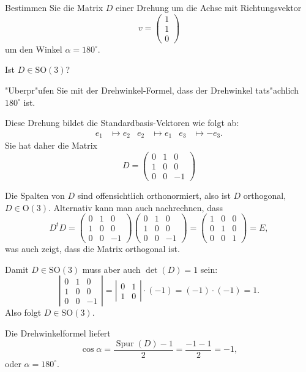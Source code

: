 Bestimmen Sie die Matrix $D$ einer Drehung um die Achse mit Richtungsvektor
\[
v=\begin{pmatrix}1\\1\\0\end{pmatrix}
\]
um den Winkel $\alpha=180^\circ$.
\begin{teilaufgaben}
\item Ist $D\in\text{SO}(3)$?
\item "Uberpr"ufen Sie mit der Drehwinkel-Formel, dass der Drehwinkel
tats"achlich $180^\circ$ ist.
\end{teilaufgaben}

\begin{loesung}
Diese Drehung bildet die Standardbasis-Vektoren wie folgt ab:
\[
\begin{aligned}
e_1&\mapsto e_2
&
e_2&\mapsto e_1
&
e_3&\mapsto -e_3.
\end{aligned}
\]
Sie hat daher die Matrix
\[
D
=
\begin{pmatrix}
0&1& 0\\
1&0& 0\\
0&0&-1
\end{pmatrix}
\]
\begin{teilaufgaben}
\item Die Spalten von $D$ sind offensichtlich orthonormiert, also ist $D$
orthogonal, $D\in\textrm{O}(3)$.
Alternativ kann man auch nachrechnen, dass
\[
D^tD
=
\begin{pmatrix}
0&1& 0\\
1&0& 0\\
0&0&-1
\end{pmatrix}
\begin{pmatrix}
0&1& 0\\
1&0& 0\\
0&0&-1
\end{pmatrix}
=
\begin{pmatrix}
1&0&0\\
0&1&0\\
0&0&1
\end{pmatrix}
=E,
\]
was auch zeigt, dass die Matrix orthogonal ist.

Damit $D\in\textrm{SO}(3)$ muss aber auch $\det(D)=1$ sein:
\[
\left|
\begin{matrix}
0&1& 0\\
1&0& 0\\
0&0&-1
\end{matrix}\right|
=
\left|\begin{matrix}0&1\\1&0\end{matrix}\right|\cdot (-1)
=(-1)\cdot(-1)=1.
\]
Also folgt $D\in\textrm{SO}(3)$.
\item
Die Drehwinkelformel liefert
\[
\cos\alpha = \frac{\operatorname{Spur}(D)-1}2=\frac{-1-1}2=-1,
\]
oder $\alpha=180^\circ$.
\end{teilaufgaben}
\end{loesung}

